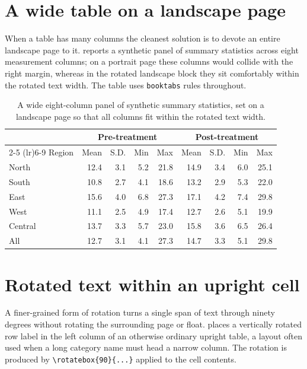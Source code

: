 \documentclass[11pt]{article}
\begin{document}
\section{A wide table on a landscape page}
\label{sec:landscape}

When a table has many columns the cleanest solution is to devote an entire
landscape page to it.  reports a synthetic panel of summary
statistics across eight measurement columns; on a portrait page these columns
would collide with the right margin, whereas in the rotated landscape block they
sit comfortably within the rotated text width. The table uses \texttt{booktabs}
rules throughout.

\begin{landscape}
  \begin{table}
    \centering
    \caption{A wide eight-column panel of synthetic summary statistics, set on a
      landscape page so that all columns fit within the rotated text width.}
    \label{tab:wide}
    \begin{tabular}{l rrrr rrrr}
      \toprule
      & \multicolumn{4}{c}{Pre-treatment} & \multicolumn{4}{c}{Post-treatment} \\
      \cmidrule(lr){2-5} \cmidrule(lr){6-9}
      Region & Mean & S.D. & Min & Max & Mean & S.D. & Min & Max \\
      \midrule
      North      & 12.4 & 3.1 & 5.2 & 21.8 & 14.9 & 3.4 & 6.0 & 25.1 \\
      South      & 10.8 & 2.7 & 4.1 & 18.6 & 13.2 & 2.9 & 5.3 & 22.0 \\
      East       & 15.6 & 4.0 & 6.8 & 27.3 & 17.1 & 4.2 & 7.4 & 29.8 \\
      West       & 11.1 & 2.5 & 4.9 & 17.4 & 12.7 & 2.6 & 5.1 & 19.9 \\
      Central    & 13.7 & 3.3 & 5.7 & 23.0 & 15.8 & 3.6 & 6.5 & 26.4 \\
      \midrule
      All        & 12.7 & 3.1 & 4.1 & 27.3 & 14.7 & 3.3 & 5.1 & 29.8 \\
      \bottomrule
    \end{tabular}
  \end{table}
\end{landscape}

\section{Rotated text within an upright cell}
\label{sec:rotbox}

A finer-grained form of rotation turns a single span of text through ninety
degrees without rotating the surrounding page or float.  places
a vertically rotated row label in the left column of an otherwise ordinary
upright table, a layout often used when a long category name must head a narrow
column. The rotation is produced by \verb|\rotatebox{90}{...}| applied to the
cell contents.
\end{document}
